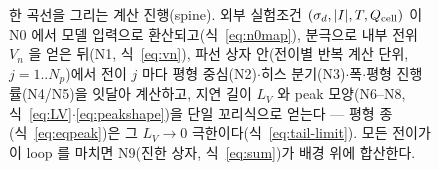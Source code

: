 \begin{figure}[t]
\caption{한 곡선을 그리는 계산 진행(spine). 외부 실험조건 $(\sigma_d,|I|,T,Q_{\mathrm{cell}})$
이 N0 에서 모델 입력으로 환산되고(식~\eqref{eq:n0map}), 분극으로 내부 전위 $V_n$ 을 얻은 뒤(N1,
식~\eqref{eq:vn}), 파선 상자 안(전이별 반복 계산 단위, $j=1..N_p$)에서 전이 $j$ 마다 평형 중심(N2)$\cdot$히스
분기(N3)$\cdot$폭$\cdot$평형 진행률(N4/N5)을 잇달아 계산하고, 지연 길이 $L_V$ 와 peak 모양(N6--N8,
식~\eqref{eq:LV}$\cdot$\eqref{eq:peakshape})을 단일 꼬리식으로 얻는다 --- 평형 종(식~\eqref{eq:eqpeak})은 그 $L_V\!\to\!0$ 극한이다(식~\eqref{eq:tail-limit}).
모든 전이가 이 loop 를 마치면 N9(진한 상자, 식~\eqref{eq:sum})가 배경 위에 합산한다.}
\label{fig:spine}
\end{figure}

\tableofcontents
\newpage

